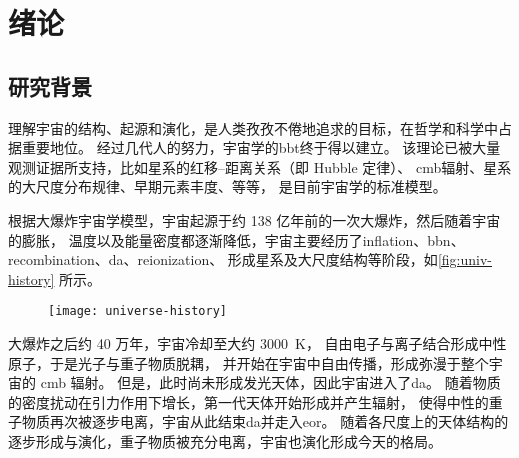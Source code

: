 
\chapter{绪论}
\label{chap:introduction}

\section{研究背景}

理解宇宙的结构、起源和演化，是人类孜孜不倦地追求的目标，在哲学和科学中占据重要地位。
经过几代人的努力，宇宙学的\ac{bbt}终于得以建立。
该理论已被大量观测证据所支持，比如星系的红移--距离关系（即 Hubble 定律）、
\ac{cmb}辐射、星系的大尺度分布规律、早期元素丰度、等等，
是目前宇宙学的标准模型。

根据大爆炸宇宙学模型，宇宙起源于约 138 亿年前的一次大爆炸，然后随着宇宙的膨胀，
温度以及能量密度都逐渐降低，宇宙主要经历了\ac{inflation}、\ac{bbn}、
\ac{recombination}、\ac{da}、\ac{reionization}、
形成星系及大尺度结构等阶段，如\autoref{fig:univ-history} 所示。

\begin{figure}[htp]
  \centering
  \texttt{[image: universe-history]}
  \label{fig:univ-history}
\end{figure}

大爆炸之后约 40 万年，宇宙冷却至大约 \SI{3000}{\kelvin}，
自由电子与离子结合形成中性原子，于是光子与重子物质脱耦，
并开始在宇宙中自由传播，形成弥漫于整个宇宙的 \ac{cmb} 辐射。
但是，此时尚未形成发光天体，因此宇宙进入了\ac{da}。
随着物质的密度扰动在引力作用下增长，第一代天体开始形成并产生辐射，
使得中性的重子物质再次被逐步电离，宇宙从此结束\ac{da}并走入\ac{eor}。
随着各尺度上的天体结构的逐步形成与演化，重子物质被充分电离，宇宙也演化形成今天的格局。

